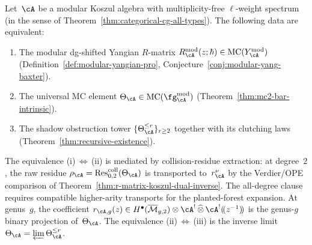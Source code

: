 \begin{conjecture}
\label{conj:dk5-restricted}
Let~$\cA$ be a modular Koszul algebra with
multiplicity-free $\ell$-weight spectrum
\textup{(}in the sense of
Theorem~\textup{\ref{thm:categorical-cg-all-types}}\textup{)}.
The following data are equivalent:
\begin{enumerate}[label=\textup{(\roman*)}]
\item The modular dg-shifted Yangian $R$-matrix
 $R_\cA^{\mathrm{mod}}(z;\hbar)
 \in \operatorname{MC}(\Ymod_\cA)$
 \textup{(}Definition~\textup{\ref{def:modular-yangian-pro}},
 Conjecture~\textup{\ref{conj:modular-yang-baxter}}\textup{)}.
\item The universal MC element
 $\Theta_\cA \in \operatorname{MC}(\fg_\cA^{\mathrm{mod}})$
 \textup{(}Theorem~\textup{\ref{thm:mc2-bar-intrinsic}}\textup{)}.
\item The shadow obstruction tower
 $\{\Theta_\cA^{\leq r}\}_{r \geq 2}$
 together with its clutching laws
 \textup{(}Theorem~\textup{\ref{thm:recursive-existence}}\textup{)}.
\end{enumerate}
The equivalence
\textup{(i)}\,$\Leftrightarrow$\,\textup{(ii)}
is mediated by collision-residue extraction:
at degree~$2$, the raw residue
$\rho_\cA=\operatorname{Res}^{\mathrm{coll}}_{0,2}(\Theta_\cA)$
is transported to~$r_\cA^\nu$ by the Verdier/OPE comparison of
Theorem~\textup{\ref{thm:r-matrix-koszul-dual-inverse}}.
The all-degree clause requires compatible higher-arity transports for
the planted-forest expansion.
At genus~$g$, the coefficient
$r_{\cA,g}(z) \in H^\bullet(\overline{\mathcal{M}}_{g,2})
\otimes \cA^! \,\widehat{\otimes}\, \cA^!(\!(z^{-1})\!)$
is the genus-$g$ binary projection of~$\Theta_\cA$.
The equivalence
\textup{(ii)}\,$\Leftrightarrow$\,\textup{(iii)}
is the inverse limit
$\Theta_\cA = \varprojlim \Theta_\cA^{\leq r}$.
\end{conjecture}

